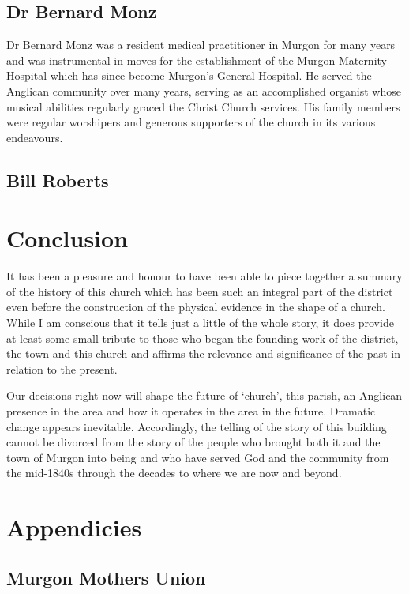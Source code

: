 \section{Dr Bernard Monz}

Dr Bernard Monz was a resident medical practitioner in Murgon for many
years and was instrumental in moves for the establishment of the Murgon
Maternity Hospital which has since become Murgon's General Hospital. He
served the Anglican community over many years, serving as an
accomplished organist whose musical abilities regularly graced the
Christ Church services. His family members were regular worshipers and
generous supporters of the church in its various endeavours.

\section{Bill Roberts}

\chapter{Conclusion}

It has been a pleasure and honour to have been able to piece together a
summary of the history of this church which has been such an integral
part of the district even before the construction of the physical
evidence in the shape of a church. While I am conscious that it tells
just a little of the whole story, it does provide at least some small
tribute to those who began the founding work of the district, the town
and this church and affirms the relevance and significance of the past
in relation to the present.

Our decisions right now will shape the future of `church', this parish,
an Anglican presence in the area and how it operates in the area in the
future. Dramatic change appears inevitable. Accordingly, the telling of
the story of this building cannot be divorced from the story of the
people who brought both it and the town of Murgon into being and who
have served God and the community from the mid-1840s through the decades
to where we are now and beyond.

\backmatter
\chapter{Appendicies}

\section{Murgon Mothers Union}

